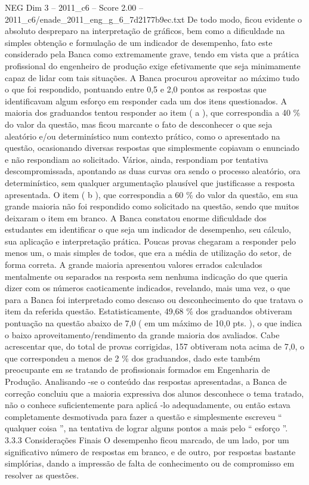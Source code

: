 \begin{textsample}{NEG Dim 3 – 2011\_c6 – Score 2.00 – 2011\_c6/enade\_2011\_eng\_g\_6\_7d2177b9ec.txt}
De todo modo, ficou evidente o absoluto despreparo na interpretação de gráficos, bem como a dificuldade na simples obtenção e formulação de um indicador de desempenho, fato este considerado pela Banca como extremamente grave, tendo em vista que a prática profissional do engenheiro de produção exige efetivamente que seja minimamente capaz de lidar com tais situações.
A Banca procurou aproveitar ao máximo tudo o que foi respondido, pontuando entre 0,5 e 2,0 pontos as respostas que identificavam algum esforço em responder cada um dos itens questionados.
A maioria dos graduandos tentou responder ao item ( a ), que correspondia a 40 \% do valor da questão, mas ficou marcante o fato de desconhecer o que seja aleatório e/ou determinístico num contexto prático, como o apresentado na questão, ocasionando diversas respostas que simplesmente copiavam o enunciado e não respondiam ao solicitado.
Vários, ainda, respondiam por tentativa descompromissada, apontando as duas curvas ora sendo o processo aleatório, ora determinístico, sem qualquer argumentação plausível que justificasse a resposta apresentada.
O item ( b ), que correspondia a 60 \% do valor da questão, em sua grande maioria não foi respondido como solicitado na questão, sendo que muitos deixaram o item em branco.
A Banca constatou enorme dificuldade dos estudantes em identificar o que seja um indicador de desempenho, seu cálculo, sua aplicação e interpretação prática.
Poucas provas chegaram a responder pelo menos um, o mais simples de todos, que era a média de utilização do setor, de forma correta.
A grande maioria apresentou valores errados calculados mentalmente ou separados na resposta sem nenhuma indicação do que queria dizer com os números caoticamente indicados, revelando, mais uma vez, o que para a Banca foi interpretado como descaso ou desconhecimento do que tratava o item da referida questão.
Estatisticamente, 49,68 \% dos graduandos obtiveram pontuação na questão abaixo de 7,0 ( em um máximo de 10,0 pts. ), o que indica o baixo aproveitamento/rendimento da grande maioria dos avaliados.
Cabe acrescentar que, do total de provas corrigidas, 157 obtiveram nota acima de 7,0, o que correspondeu a menos de 2 \% dos graduandos, dado este também preocupante em se tratando de profissionais formados em Engenharia de Produção.
Analisando -se o conteúdo das respostas apresentadas, a Banca de correção concluiu que a maioria expressiva dos alunos desconhece o tema tratado, não o conhece suficientemente para aplicá -lo adequadamente, ou então estava completamente desmotivada para fazer a questão e simplesmente escreveu “ qualquer coisa ”, na tentativa de lograr alguns pontos a mais pelo “ esforço ”. 3.3.3 Considerações Finais O desempenho ficou marcado, de um lado, por um significativo número de respostas em branco, e de outro, por respostas bastante simplórias, dando a impressão de falta de conhecimento ou de compromisso em resolver as questões.

\end{textsample}
